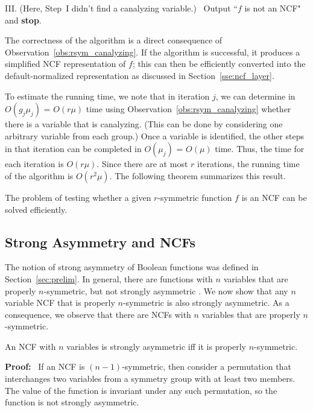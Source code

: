 \smallskip
\noindent
III. (Here, Step~I didn't find a canalyzing variable.)~ 
Output ``$f$ is not an NCF" and \textbf{stop}.

\medskip
\noindent
The correctness of the algorithm is a direct consequence of
Observation~\ref{obs:rsym_canalyzing}. If the algorithm is successful,
it produces a simplified NCF representation of $f$; this can then be
efficiently converted into the default-normalized representation as
discussed in Section~\ref{sse:ncf_layer}.

To estimate the running time, we note that in iteration $j$, we can
determine in $O(g_j \mu_j)$ = $O(r \mu)$ time using 
Observation~\ref{obs:rsym_canalyzing}
whether there is a variable that is canalyzing.
(This can be done by considering one arbitrary variable 
from each group.)
Once a variable is identified, the other steps in that iteration
can be completed in $O(\mu_j)$ = $O(\mu)$ time.
Thus, the time for each iteration is $O(r \mu)$.
Since there are at most $r$ iterations, the running time of the
algorithm is $O(r^2 \mu)$.
The following theorem summarizes this result. 

\begin{theorem}\label{thm:rsym_canalyzing}
The problem of testing whether a given 
$r$-symmetric function $f$ is an NCF can 
be solved efficiently. \QED
\end{theorem}

\subsection{Strong Asymmetry and NCFs}
\label{sse:strong_asym_ncf}

The notion of strong asymmetry of Boolean functions was defined 
in Section~\ref{sec:prelim}.
In general, there are functions with $n$ variables that are properly
$n$-symmetric, but not strongly asymmetric \cite{KS-2000}.
We now show that any $n$ variable NCF that is properly $n$-symmetric
is also strongly asymmetric.
As a consequence, we observe that there are NCFs with $n$ variables
that are properly $n$-symmetric.

\begin{theorem}\label{thm:ncf_strong_asymmetry}
An NCF with $n$ variables is strongly asymmetric iff
it is properly $n$-symmetric.
\end{theorem}

\noindent
\textbf{Proof:}~ 
If an NCF is $(n-1)$-symmetric, then consider a permutation that
interchanges two variables from a symmetry group with at least two
members.  The value of the function is invariant under any such
permutation, so the function is not strongly asymmetric.

